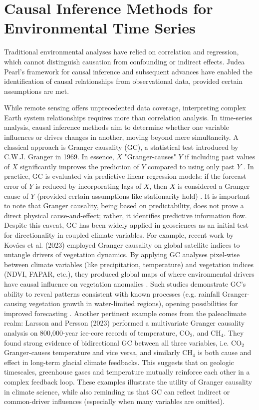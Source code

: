 

\section{Causal Inference Methods for Environmental Time Series}

Traditional environmental analyses have relied on correlation and regression, which cannot distinguish causation from confounding or indirect effects. Judea Pearl's framework for causal inference \cite{Pearl2009} and subsequent advances have enabled the identification of causal relationships from observational data, provided certain assumptions are met.

While remote sensing offers unprecedented data coverage, interpreting complex Earth system relationships requires more than correlation analysis. In time-series analysis, causal inference methods aim to determine whether one variable influences or drives changes in another, moving beyond mere simultaneity. A classical approach is Granger causality (GC), a statistical test introduced by C.W.J. Granger in 1969. In essence, $X$ "Granger-causes" $Y$ if including past values of $X$ significantly improves the prediction of $Y$ compared to using only past $Y$ \cite{Kovacs2023}. In practice, GC is evaluated via predictive linear regression models: if the forecast error of $Y$ is reduced by incorporating lags of $X$, then $X$ is considered a Granger cause of $Y$ (provided certain assumptions like stationarity hold)
\cite{Kovacs2023}. It is important to note that Granger causality, being based on predictability, does not prove a direct physical cause-and-effect; rather, it identifies predictive information flow. Despite this caveat, GC has been widely applied in geosciences as an initial test for directionality in coupled climate variables. For example, recent work by Kovács et al. (2023) \cite{Kovacs2023} employed Granger causality on global satellite indices to untangle drivers of vegetation dynamics. By applying GC analyses pixel-wise between climate variables (like precipitation, temperature) and vegetation indices (NDVI, FAPAR, etc.), they produced global maps of where environmental drivers have causal influence on vegetation anomalies \cite{Kovacs2023}. Such studies demonstrate GC's ability to reveal patterns consistent with known processes (e.g. rainfall Granger-causing vegetation growth in water-limited regions), opening possibilities for improved forecasting \cite{Kovacs2023}. Another pertinent example comes from the paleoclimate realm: Larsson and Persson (2023) \cite{Larsson2023} performed a multivariate Granger causality analysis on 800,000-year ice-core records of temperature, CO$_2$, and CH$_4$. They found strong evidence of bidirectional GC between all three variables, i.e. CO$_2$ Granger-causes temperature and vice versa, and similarly CH$_4$ is both cause and effect in long-term glacial climate feedbacks. This suggests that on geologic timescales, greenhouse gases and temperature mutually reinforce each other in a complex feedback loop. These examples illustrate the utility of Granger causality in climate science, while also reminding us that GC can reflect indirect or common-driver influences (especially when many variables are omitted). 


